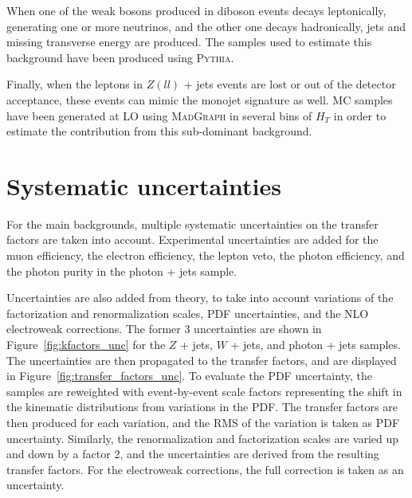 When one of the weak bosons produced in diboson events decays leptonically, generating one or more neutrinos, and the other one decays hadronically, jets and missing transverse energy are produced. The samples used to estimate this background have been produced using \textsc{Pythia}.

Finally, when the leptons in $Z(ll)$ + jets events are lost or out of the detector acceptance, these events can mimic the monojet signature as well. MC samples have been generated at \ac{LO} using \textsc{MadGraph} in several bins of $H_T$ in order to estimate the contribution from this sub-dominant background.

\section{Systematic uncertainties}
\label{sec:syst}

For the main backgrounds, multiple systematic uncertainties on the transfer factors are taken into account. Experimental uncertainties are added for the muon efficiency, the electron efficiency, the lepton veto, the photon efficiency, and the photon purity in the photon + jets sample. 

Uncertainties are also added from theory, to take into account variations of the factorization and renormalization scales, PDF uncertainties, and the NLO electroweak corrections. The former 3 uncertainties are shown in Figure~\ref{fig:kfactors_unc} for the $Z$ + jets, $W$ + jets, and photon + jets samples. The  uncertainties are then propagated to the transfer factors, and are displayed in Figure~\ref{fig:transfer_factors_unc}. To evaluate the PDF uncertainty, the samples are reweighted with event-by-event scale factors representing the shift in the kinematic distributions from variations in the PDF. The transfer factors are then produced for each variation, and the RMS of the variation is taken as PDF uncertainty. Similarly, the renormalization and factorization scales are varied up and down by a factor 2, and the uncertainties are derived from the resulting transfer factors. For the electroweak corrections, the full correction is taken as an uncertainty.

